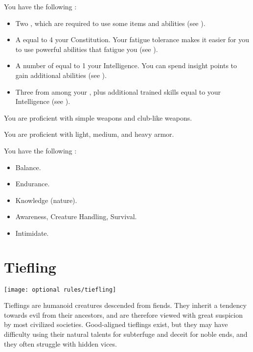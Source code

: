          You have the following :
        \begin{itemize}
            \item Two , which are required to use some items and abilities (see ).
            \item A  equal to 4 \add your Constitution.
                Your fatigue tolerance makes it easier for you to use powerful abilities that fatigue you (see ).
            \item A number of  equal to 1 \add your Intelligence.
                You can spend insight points to gain additional abilities (see ).
            \item Three  from among your , plus additional trained skills equal to your Intelligence (see ).
        \end{itemize}

        You are proficient with simple weapons and club-like weapons.

        You are proficient with light, medium, and heavy armor.

        You have the following :
        \begin{itemize}
            \item {} Balance.
            \item {} Endurance.
            \item {} Knowledge (nature).
            \item {} Awareness, Creature Handling, Survival.
            \item {} Intimidate.
        \end{itemize}

\section{Tiefling}
    \texttt{[image: optional rules/tiefling]}

    Tieflings are humanoid creatures descended from fiends.
    They inherit a tendency towards evil from their ancestors, and are therefore viewed with great suspicion by most civilized societies.
    Good-aligned tieflings exist, but they may have difficulty using their natural talents for subterfuge and deceit for noble ends, and they often struggle with hidden vices.


